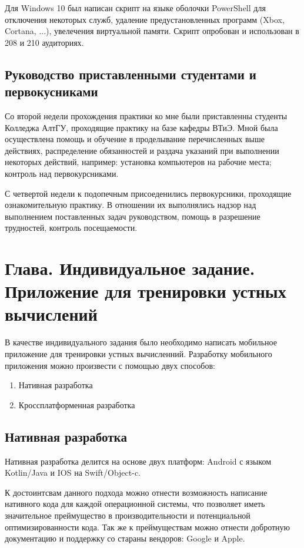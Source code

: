 \documentclass[14pt, oneside]{altsu-report}
\begin{document}
Для Windows 10 был написан скрипт на языке оболочки PowerShell для отключения некоторых служб, удаление предустановленных программ (Xbox, Cortana, ...), увелечения виртуальной памяти. Скрипт опробован и использован в 208 и 210 аудиториях.

\section{Руководство приставленными студентами и первокусниками}
Со второй недели прохождения практики ко мне были приставленны студенты Колледжа АлтГУ, проходящие практику на базе кафедры ВТиЭ. Мной была осуществлена помощь и обучение в проделывание перечисленных выше действиях, распределение обязанностей и раздача указаний при выполнении некоторых действий, например: установка компьютеров на рабочие места; контроль над первокурсниками.

С четвертой недели к подопечным присоеденились первокурсники, проходящие ознакомительную практику. В отношении их выполнялись надзор над выполнением поставленных задач руководством, помощь в разрешение трудностей, контроль посещаемости.

\chapter{Глава. Индивидуальное задание. Приложение для тренировки устных вычислений}
В качестве индивидуального задания было необходимо написать мобильное приложение для тренировки устных вычисленний. 
Разработку мобильного приложения можно произвести с помощью двух способов:
\begin{enumerate}
  \item Нативная разработка \cite{nativDev}
  \item Кроссплатформенная разработка \cite{crosDev}
\end{enumerate}
\section*{Нативная разработка}
Нативная разработка делится на основе двух платформ: Android с языком Kotlin/Java и IOS на Swift/Object-c.

К достоинтсвам данного подхода можно отнести возможность написание нативного кода для каждой операционной системы, что позволяет иметь значительное преймущество в производительности и потенциальной оптимизированности кода. Так же к преймуществам можно отнести добротную документацию и поддержку со стараны вендоров: Google и Apple.
\end{document}
